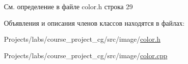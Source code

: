 См. определение в файле color.\+h строка 29



Объявления и описания членов классов находятся в файлах\+:\begin{DoxyCompactItemize}
\item 
Projects/labs/course\+\_\+project\+\_\+cg/src/image/\hyperlink{color_8h}{color.\+h}\item 
Projects/labs/course\+\_\+project\+\_\+cg/src/image/\hyperlink{color_8cpp}{color.\+cpp}\end{DoxyCompactItemize}
